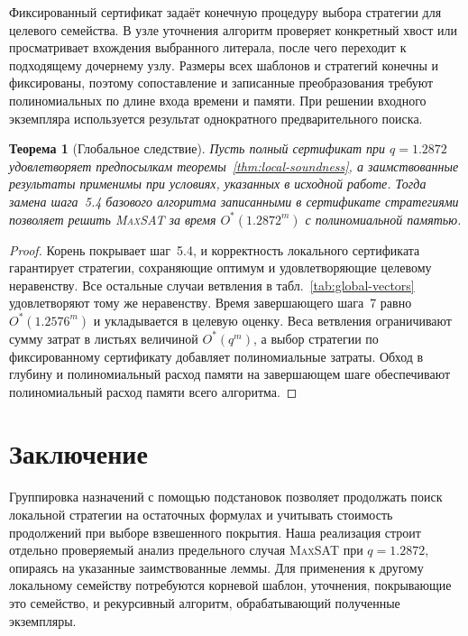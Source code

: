 \documentclass[10pt,twoside]{article}
\newcommand{\MaxSAT}{\textnormal{\textsc{MaxSAT}}}
\newcommand{\OhStar}{O^*}
\newtheorem{theorem}{Теорема}
\theoremstyle{definition}
\theoremstyle{remark}
\begin{document}
Фиксированный сертификат задаёт конечную процедуру выбора стратегии
для целевого семейства. В узле уточнения алгоритм проверяет конкретный
хвост или просматривает вхождения выбранного литерала, после чего
переходит к подходящему дочернему узлу. Размеры всех шаблонов и
стратегий конечны и фиксированы, поэтому сопоставление и записанные
преобразования требуют полиномиальных по длине входа времени и памяти.
При решении входного экземпляра используется результат однократного
предварительного поиска.

\begin{theorem}[Глобальное следствие]
\label{thm:conditional-global}
Пусть полный сертификат при $q=1.2872$ удовлетворяет предпосылкам
теоремы~\ref{thm:local-soundness}, а заимствованные результаты
применимы при условиях, указанных в исходной работе. Тогда замена
шага~5.4 базового алгоритма записанными в сертификате стратегиями
позволяет решить \MaxSAT{} за время $\OhStar(1.2872^m)$ с
полиномиальной памятью.
\end{theorem}
\begin{proof}
Корень покрывает шаг~5.4, и корректность локального сертификата
гарантирует стратегии, сохраняющие оптимум и удовлетворяющие целевому
неравенству. Все остальные случаи ветвления в
табл.~\ref{tab:global-vectors} удовлетворяют тому же неравенству.
Время завершающего шага~7 равно $\OhStar(1.2576^m)$ и укладывается
в целевую оценку. Веса ветвления ограничивают сумму затрат в листьях
величиной $\OhStar(q^m)$, а выбор стратегии по фиксированному
сертификату добавляет полиномиальные затраты. Обход в глубину
и полиномиальный расход памяти на завершающем шаге обеспечивают
полиномиальный расход памяти всего алгоритма.
\end{proof}

\section{Заключение}
\label{sec:conclusion}

Группировка назначений с помощью подстановок позволяет продолжать
поиск локальной стратегии на остаточных формулах и учитывать стоимость
продолжений при выборе взвешенного покрытия. Наша реализация строит
отдельно проверяемый анализ предельного случая \MaxSAT{} при
$q=1.2872$, опираясь на указанные заимствованные леммы. Для применения
к другому локальному семейству потребуются корневой шаблон, уточнения,
покрывающие это семейство, и рекурсивный алгоритм, обрабатывающий
полученные экземпляры.

\appendix
\end{document}
